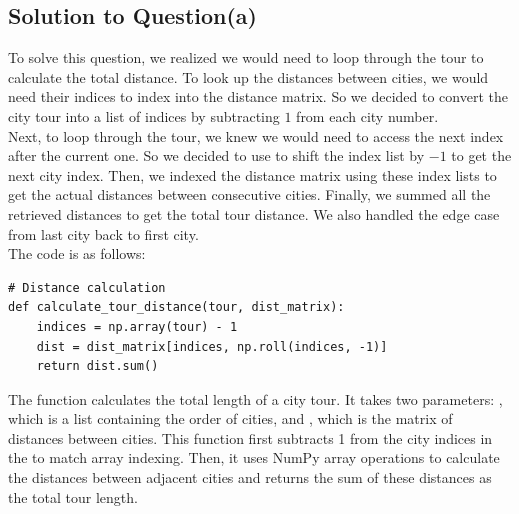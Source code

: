 \documentclass[a4paper]{article}
\begin{document}
\subsection{Solution to Question(a)}
To solve this question, we realized we would need to loop through the tour to calculate the total distance. To look up the distances between cities, we would need their indices to index into the distance matrix. So we decided to convert the city tour into a list of indices by subtracting $1$ from each city number.\\
Next, to loop through the tour, we knew we would need to access the next index after the current one. So we decided to use  to shift the index list by $-1$ to get the next city index.
Then, we indexed the distance matrix using these index lists to get the actual distances between consecutive cities.
Finally, we summed all the retrieved distances to get the total tour distance. We also handled the edge case from last city back to first city.\\
The code is as follows:
\begin{verbatim}
# Distance calculation
def calculate_tour_distance(tour, dist_matrix):
    indices = np.array(tour) - 1
    dist = dist_matrix[indices, np.roll(indices, -1)]
    return dist.sum()
\end{verbatim}
The  function calculates the total length of a city tour. It takes two parameters: , which is a list containing the order of cities, and , which is the matrix of distances between cities. This function first subtracts 1 from the city indices in the  to match array indexing. Then, it uses NumPy array operations to calculate the distances between adjacent cities and returns the sum of these distances as the total tour length.
\end{document}
